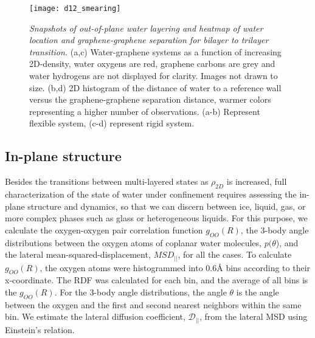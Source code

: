 \documentclass[journal=acsnano,manuscript=article]{achemso}
\begin{document}
	\begin{figure}[ht!]
		\centering
		\texttt{[image: d12\_smearing]} %
		\caption{\textit{Snapshots of out-of-plane water layering and heatmap of water location and graphene-graphene separation for bilayer to trilayer transition.} (a,c) Water-graphene systems as a function of increasing 2D-density, water oxygens are red, graphene carbons are grey and water hydrogens are not displayed for clarity. Images not drawn to size. (b,d) 2D histogram of the distance of water to a reference wall versus the graphene-graphene separation distance, warmer colors representing a higher number of observations. (a-b) Represent flexible system, (c-d) represent rigid system.}
		\label{fig:dgg_2_to_3}
	\end{figure}
	

\subsection{In-plane structure}

Besides the transitions between multi-layered states as \(\rho_{2D}\) is increased, full characterization of the state of water under confinement requires assessing the in-plane structure and dynamics, so that we can discern between ice, liquid, gas, or more complex phases such as glass or heterogeneous liquids. For this purpose, we calculate the oxygen-oxygen pair correlation function \(g_{OO}(R)\), the 3-body angle distributions between the oxygen atoms of coplanar water molecules, \(p(\theta\)), and the lateral mean-squared-displacement, \(MSD_{||}\), for all the cases. To calculate \(g_{OO}(R)\), the oxygen atoms were histogrammed into 0.6\r A bins according to their x-coordinate. The RDF was calculated for each bin, and the average of all bins is the \(g_{OO}(R)\). For the 3-body angle distributions, the angle \(\theta\) is the angle between the oxygen and the first and second nearest neighbors within the same bin. We estimate the lateral diffusion coefficient, \(\mathcal{D}_{||}\), from the lateral MSD using Einstein's relation.
\end{document}
